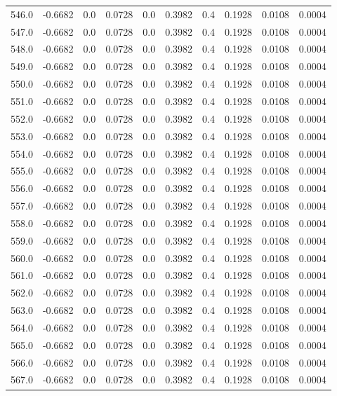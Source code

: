 \begin{longtable}{lrrrrrrrrr}
546.0 & -0.6682 & 0.0 & 0.0728 & 0.0 & 0.3982 & 0.4 & 0.1928 & 0.0108 & 0.0004 \\
547.0 & -0.6682 & 0.0 & 0.0728 & 0.0 & 0.3982 & 0.4 & 0.1928 & 0.0108 & 0.0004 \\
548.0 & -0.6682 & 0.0 & 0.0728 & 0.0 & 0.3982 & 0.4 & 0.1928 & 0.0108 & 0.0004 \\
549.0 & -0.6682 & 0.0 & 0.0728 & 0.0 & 0.3982 & 0.4 & 0.1928 & 0.0108 & 0.0004 \\
550.0 & -0.6682 & 0.0 & 0.0728 & 0.0 & 0.3982 & 0.4 & 0.1928 & 0.0108 & 0.0004 \\
551.0 & -0.6682 & 0.0 & 0.0728 & 0.0 & 0.3982 & 0.4 & 0.1928 & 0.0108 & 0.0004 \\
552.0 & -0.6682 & 0.0 & 0.0728 & 0.0 & 0.3982 & 0.4 & 0.1928 & 0.0108 & 0.0004 \\
553.0 & -0.6682 & 0.0 & 0.0728 & 0.0 & 0.3982 & 0.4 & 0.1928 & 0.0108 & 0.0004 \\
554.0 & -0.6682 & 0.0 & 0.0728 & 0.0 & 0.3982 & 0.4 & 0.1928 & 0.0108 & 0.0004 \\
555.0 & -0.6682 & 0.0 & 0.0728 & 0.0 & 0.3982 & 0.4 & 0.1928 & 0.0108 & 0.0004 \\
556.0 & -0.6682 & 0.0 & 0.0728 & 0.0 & 0.3982 & 0.4 & 0.1928 & 0.0108 & 0.0004 \\
557.0 & -0.6682 & 0.0 & 0.0728 & 0.0 & 0.3982 & 0.4 & 0.1928 & 0.0108 & 0.0004 \\
558.0 & -0.6682 & 0.0 & 0.0728 & 0.0 & 0.3982 & 0.4 & 0.1928 & 0.0108 & 0.0004 \\
559.0 & -0.6682 & 0.0 & 0.0728 & 0.0 & 0.3982 & 0.4 & 0.1928 & 0.0108 & 0.0004 \\
560.0 & -0.6682 & 0.0 & 0.0728 & 0.0 & 0.3982 & 0.4 & 0.1928 & 0.0108 & 0.0004 \\
561.0 & -0.6682 & 0.0 & 0.0728 & 0.0 & 0.3982 & 0.4 & 0.1928 & 0.0108 & 0.0004 \\
562.0 & -0.6682 & 0.0 & 0.0728 & 0.0 & 0.3982 & 0.4 & 0.1928 & 0.0108 & 0.0004 \\
563.0 & -0.6682 & 0.0 & 0.0728 & 0.0 & 0.3982 & 0.4 & 0.1928 & 0.0108 & 0.0004 \\
564.0 & -0.6682 & 0.0 & 0.0728 & 0.0 & 0.3982 & 0.4 & 0.1928 & 0.0108 & 0.0004 \\
565.0 & -0.6682 & 0.0 & 0.0728 & 0.0 & 0.3982 & 0.4 & 0.1928 & 0.0108 & 0.0004 \\
566.0 & -0.6682 & 0.0 & 0.0728 & 0.0 & 0.3982 & 0.4 & 0.1928 & 0.0108 & 0.0004 \\
567.0 & -0.6682 & 0.0 & 0.0728 & 0.0 & 0.3982 & 0.4 & 0.1928 & 0.0108 & 0.0004 \\

\end{longtable}

